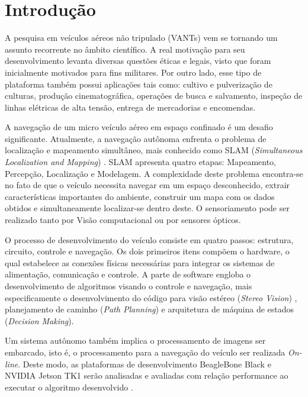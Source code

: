 \chapter{Introdução}
\label{Introducao}

A pesquisa em veículos aéreos não tripulado (VANTs) vem se tornando um assunto recorrente no âmbito científico. A real motivação para seu desenvolvimento levanta diversas questões éticas e legais, visto que foram inicialmente motivados para fins militares. Por outro lado, esse tipo de plataforma também possui aplicações tais como: cultivo e pulverização de culturas, produção cinematográfica, operações de busca e salvamento, inspeção de linhas elétricas de alta tensão, entrega de mercadorias e encomendas.

A navegação de um micro veículo aéreo em espaço confinado é um desafio significante. Atualmente, a navegação autônoma enfrenta o problema de localização e mapeamento simultâneo, mais conhecido como SLAM (\textit{Simultaneous Localization and Mapping}) \cite{Dissanayake2001}. SLAM apresenta quatro etapas: Mapeamento, Percepção, Localização e Modelagem. A complexidade deste problema encontra-se no fato de que o veículo necessita navegar em um espaço desconhecido, extrair características importantes do ambiente, construir um mapa com os dados obtidos e simultaneamente localizar-se dentro deste. O sensoriamento pode ser realizado tanto por Visão computacional ou por sensores ópticos. 

O processo de desenvolvimento do veículo consiste em quatro passos: estrutura, circuito, controle e navegação. Os dois primeiros itens compõem o hardware, o qual estabelece as conexões físicas necessárias para integrar os sistemas de alimentação, comunicação e controle. A parte de software engloba o desenvolvimento de algoritmos visando o controle e navegação, mais especificamente o desenvolvimento do código para visão estéreo (\textit{Stereo Vision}) \cite{Lemaire2007}, planejamento de caminho (\textit{Path Planning}) e arquitetura de máquina de estados (\textit{Decision Making}).

Um sistema autônomo também implica o processamento de imagens ser embarcado, isto é, o processamento para a navegação do veículo ser realizada \textit{On-line}. Deste modo, as plataformas de desenvolvimento BeagleBone Black e NVIDIA Jetson TK1 serão analisadas e avaliadas com relação performance ao executar o algoritmo desenvolvido \cite{Shah2014}. 

